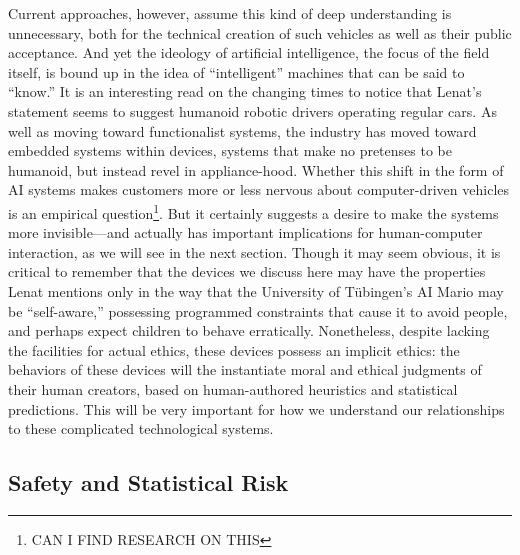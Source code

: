 Current approaches, however, assume this kind of deep understanding is
unnecessary, both for the technical creation of such vehicles as well
as their public acceptance. And yet the ideology of artificial
intelligence, the focus of the field itself, is bound up in the idea
of ``intelligent'' machines that can be said to ``know.'' It is an
interesting read on the changing 
times to notice that Lenat's statement seems to suggest humanoid
robotic drivers operating regular cars. As well as moving toward
functionalist systems, the industry has moved toward embedded systems
within devices, systems that make no pretenses to be humanoid, but
instead revel in appliance-hood. Whether this shift in the form of AI
systems makes customers more or less nervous about computer-driven
vehicles is an empirical question\footnote{CAN I FIND RESEARCH ON
  THIS}. But it certainly suggests a desire to make the systems more
invisible---and actually has important implications for human-computer
interaction, as we will see in the next section. Though it may seem
obvious, it is critical to remember that the devices we discuss here may
have the properties Lenat mentions only in the way that the University
of T\"{u}bingen's AI Mario may be
``self-aware,'' possessing programmed constraints that cause it to
avoid people, and perhaps expect children to behave erratically.
Nonetheless, despite lacking the facilities for actual ethics, these
devices possess an implicit ethics: the
behaviors of these devices will the instantiate moral and
ethical judgments of their human creators, based on
human-authored heuristics and statistical predictions. This will be
very important for how we understand our relationships to these
complicated technological systems.



\subsection{Safety and Statistical Risk}

